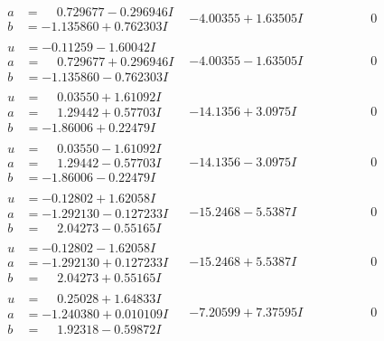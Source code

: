 \documentclass[1p]{elsarticle_modified}
\theoremstyle{definition}
\begin{document}
$$\begin{array}{c|c|c}
\begin{aligned}
a &= \phantom{-}0.729677 - 0.296946 I \\
b &= -1.135860 + 0.762303 I\end{aligned}
 & -4.00355 + 1.63505 I & \phantom{-0.000000 } 0 \\ \hline\begin{aligned}
u &= -0.11259 - 1.60042 I \\
a &= \phantom{-}0.729677 + 0.296946 I \\
b &= -1.135860 - 0.762303 I\end{aligned}
 & -4.00355 - 1.63505 I & \phantom{-0.000000 } 0 \\ \hline\begin{aligned}
u &= \phantom{-}0.03550 + 1.61092 I \\
a &= \phantom{-}1.29442 + 0.57703 I \\
b &= -1.86006 + 0.22479 I\end{aligned}
 & -14.1356 + 3.0975 I & \phantom{-0.000000 } 0 \\ \hline\begin{aligned}
u &= \phantom{-}0.03550 - 1.61092 I \\
a &= \phantom{-}1.29442 - 0.57703 I \\
b &= -1.86006 - 0.22479 I\end{aligned}
 & -14.1356 - 3.0975 I & \phantom{-0.000000 } 0 \\ \hline\begin{aligned}
u &= -0.12802 + 1.62058 I \\
a &= -1.292130 - 0.127233 I \\
b &= \phantom{-}2.04273 - 0.55165 I\end{aligned}
 & -15.2468 - 5.5387 I & \phantom{-0.000000 } 0 \\ \hline\begin{aligned}
u &= -0.12802 - 1.62058 I \\
a &= -1.292130 + 0.127233 I \\
b &= \phantom{-}2.04273 + 0.55165 I\end{aligned}
 & -15.2468 + 5.5387 I & \phantom{-0.000000 } 0 \\ \hline\begin{aligned}
u &= \phantom{-}0.25028 + 1.64833 I \\
a &= -1.240380 + 0.010109 I \\
b &= \phantom{-}1.92318 - 0.59872 I\end{aligned}
 & -7.20599 + 7.37595 I & \phantom{-0.000000 } 0 \\ \hline\begin{aligned}

\end{aligned}
\end{array}$$
\end{document}
